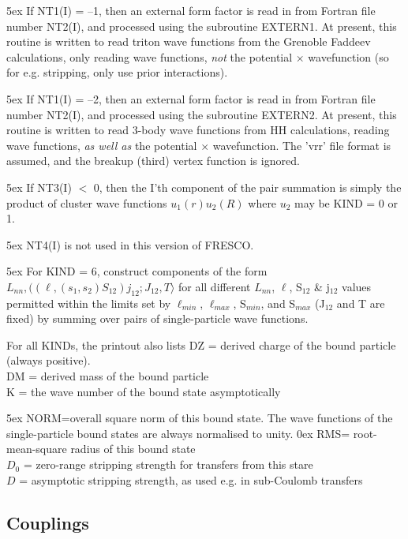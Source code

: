 \documentclass[11pt]{article}
\begin{document}
\hangindent 5ex
If NT1(I) = --1, then an external form factor is read in from Fortran file
number NT2(I), and processed using the subroutine EXTERN1.
At present, this routine is written to read triton wave functions
from the Grenoble Faddeev calculations,
only reading wave functions, {\em not} the potential $\times$
wavefunction (so for e.g. stripping, only use prior interactions).

\hangindent 5ex
If NT1(I) = --2, then an external form factor is read in from Fortran file
number NT2(I), and processed using the subroutine EXTERN2.
At present, this routine is written to read 3-body wave functions
from HH calculations, reading wave functions, {\em as well as} the
potential $\times$ wavefunction. The 'vrr' file format is assumed,
and the breakup (third) vertex function  is ignored.
\bigskip

\hangindent 5ex
If NT3(I) $<$ 0, then the I'th component of the pair summation is simply
the product of cluster wave functions $u_1(r)  u_2(R) $
where $u_{2}$ may be KIND = 0 or 1.
\bigskip

\hangindent 5ex
NT4(I) is not used in this version of FRESCO.
\bigskip

\hangindent 5ex
For KIND = 6, construct components of the form
$
              L_{nn}, ((\ell, (s_1,s_2)S_{12})j_{12}; J_{12},T\rangle
$
for all different $L_{nn}$, $\ell$, S$_{12}$ \& j$_{12}$ values permitted within the
limits set by $\ell_{min}$, $\ell_{max}$, S$_{min}$, and S$_{max}$
(J$_{12}$ and T are fixed)
by summing over pairs of single-particle wave functions.
\bigskip

For all KINDs, the printout also lists
\bigskip
DZ = derived charge of the bound particle (always positive).
\\
DM = derived mass of the bound particle
\\
K  = the wave number of the bound state asymptotically

\hangindent 5ex
NORM=overall square norm of this bound state.
The wave functions of the single-particle bound states are always
normalised to unity.
%
\hangindent 0ex
RMS= root-mean-square radius of this bound state
\\
$D_{0}$ = zero-range stripping strength for transfers from this stare
\\
$D$  = asymptotic stripping strength, as used e.g. in sub-Coulomb
transfers

\newpage
\subsection{Couplings}
%
\end{document}
